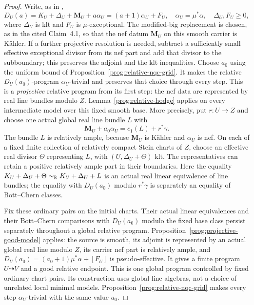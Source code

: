 \begin{proof}
Write, as in \cite[Theorem~4.1, Claim~4.1]{HX},
\[
 D_U(a)=K_U+\Delta_U+\mathbf M_U+a\alpha_U
     =(a+1)\alpha_U+F_U,
 \quad \alpha_U=\mu^*\alpha,\quad
 \Delta_U,F_U\geq0,
\]
where $\Delta_U$ is klt and $F_U$ is $\mu$-exceptional.
The modified-big replacement is chosen, as in the cited Claim~4.1,
so that the nef datum $\mathbf M_U$ on this smooth carrier is
K\"ahler. If a further projective resolution is needed, subtract a
sufficiently small effective exceptional divisor from its nef part
and add that divisor to the subboundary; this preserves the
adjoint and the klt inequalities.
Choose $a_0$ using the uniform bound of
Proposition~\ref{prog:relative-nqc-grid}. It makes the relative
$D_U(a_0)$-program $\alpha_U$-trivial and preserves that choice
through every step. This is a
\emph{projective} relative program from its first step: the nef
data are represented by real line bundles modulo $Z$.
Lemma~\ref{prog:relative-hodge} applies on every
intermediate model over this fixed smooth base.
More precisely, put $r:U\to Z$ and choose one actual global real
line bundle $L$ with
\[
 \mathbf M_U+a_0\alpha_U=c_1(L)+r^*\gamma.
\]
The bundle $L$ is relatively ample, because $\mathbf M_U$ is
K\"ahler and $\alpha_U$ is nef. On each of a fixed finite collection
of relatively compact Stein charts of $Z$, choose an effective
real divisor $\Theta$ representing $L$, with $(U,\Delta_U+\Theta)$
klt. The representatives can retain a positive relatively ample
part in their boundaries. Here the equality
$K_U+\Delta_U+\Theta\sim_{\mathbb R}K_U+\Delta_U+L$ is an actual
real linear equivalence of line bundles; the equality with
$D_U(a_0)$ modulo $r^*\gamma$ is separately an equality of
Bott--Chern classes.

Fix these ordinary pairs on the initial charts. Their actual
linear equivalences and their Bott--Chern comparisons with $D_U(a_0)$
modulo the fixed base class persist separately throughout a global
relative program. Proposition~\ref{prog:projective-good-model} applies:
the source is smooth, its adjoint is represented by an actual global
real line modulo $Z$, its carrier nef part is relatively ample, and
$D_U(a_0)=(a_0+1)\mu^*\alpha+[F_U]$ is pseudo-effective.
It gives a finite program $U\dasharrow V$ and a good relative endpoint.
This is one global program controlled by fixed ordinary chart pairs.
Its construction uses global line algebras, not a choice of unrelated
local minimal models. Proposition~\ref{prog:relative-nqc-grid} makes
every step $\alpha_U$-trivial with the same value $a_0$.


\end{proof}
